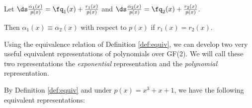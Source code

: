 {%
\begin{definition}
\label{def:equiv}
\begin{center}
Let  \hspace{5mm}
   $\ds \frac{\alpha_1(x)}{p(x)} = \fq_1(x) + \frac{r_1(x)}{p(x)}$
\hspace{5mm} and \hspace{5mm}
   $\ds \frac{\alpha_2(x)}{p(x)} = \fq_2(x) + \frac{r_2(x)}{p(x)}$.
\end{center}

Then $\alpha_1(x)\equiv \alpha_2(x)$ with respect to $p(x)$ if $r_1(x)=r_2(x)$.
\end{definition}

Using the equivalence relation of Definition \ref{def:equiv},
we can develop two very useful equivalent representations of
polynomials over GF(2).
We will call these two representations the {\em exponential} representation
and the {\em polynomial} representation.

\begin{example}
\label{ex:representations}
By Definition \ref{def:equiv} and
under $p(x)=x^3+x+1$, we have the following equivalent representations:


\end{example}}
